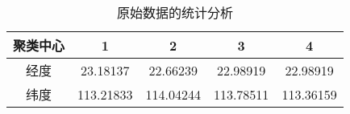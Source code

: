 \documentclass[withoutpreface,bwprint]{../CUMCMThesis/cumcmthesis} %
\begin{document}
\begin{table}[H]
  \centering
  \caption{原始数据的统计分析}
  \begin{tabular}{ccccc}
    \hline
    聚类中心 & 1         & 2         & 3         & 4         \\
    \hline
    经度   & 23.18137  & 22.66239  & 22.98919  & 22.98919  \\
    纬度   & 113.21833 & 114.04244 & 113.78511 & 113.36159 \\
    \hline
  \end{tabular}
\end{table}
\end{document}
